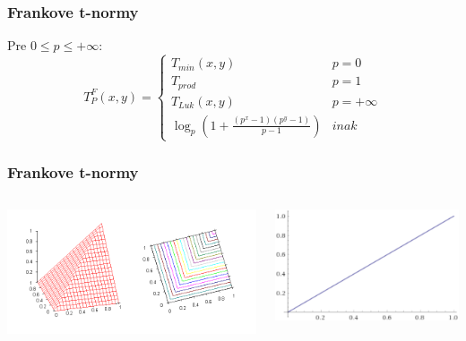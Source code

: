 \documentclass{beamer}
\begin{document}
\begin{frame}
\frametitle{Frankove t-normy}
Pre $0 \leq p \leq +\infty$:
\[ T_P^{F}(x,y)=\begin{cases} 
      T_{min}(x,y) & p = 0 \\
      T_{prod} & p = 1 \\
      T_{Luk}(x,y) & p = +\infty \\
      \log_p(1+\frac{(p^x-1)(p^y-1)}{p-1}) & inak
   \end{cases}
\]
\end{frame}



\begin{frame}
\frametitle{Frankove t-normy}
\begin{columns}
\begin{minipage}[c][0.4\textheight][c]{\linewidth}
  \centering
  \includegraphics[width=1.1\linewidth]{MinimumTnorm}
\end{minipage}
\begin{minipage}[c][0.4\textheight][c]{\linewidth}
  \centering
  \includegraphics[width=0.7\linewidth]{minDiag}
\end{minipage}
\begin{minipage}[c][0.4\textheight][c]{\linewidth}
  \centering

\end{minipage}
\end{columns}
\end{frame}
\end{document}
